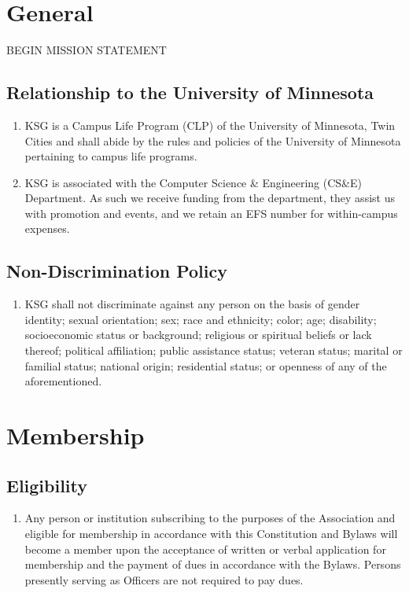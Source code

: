 \documentclass[12pt,letterpaper]{article}
\begin{document}
\section{General}

BEGIN MISSION STATEMENT

\subsection{Relationship to the University of Minnesota}
\begin{enumerate}
	\item KSG is a Campus Life Program (CLP) of the University of Minnesota,
        Twin Cities and shall abide by the rules and policies of the University
				of Minnesota pertaining to campus life programs.
	\item KSG is associated with the Computer Science \& Engineering (CS\&E)
	      Department. As such we receive funding from the department, they assist
				us with promotion and events, and we retain an EFS number for
				within-campus expenses.
\end{enumerate}

\subsection{Non-Discrimination Policy}
\begin{enumerate}
	\item KSG shall not discriminate against any person on the basis of gender
	      identity; sexual orientation; sex; race and ethnicity; color; age;
				disability; socioeconomic status or background; religious or spiritual
				beliefs or lack thereof; political affiliation; public assistance status;
				veteran status; marital or familial status; national origin; residential
				status; or openness of any of the aforementioned.
\end{enumerate}

\section{Membership}

\subsection{Eligibility}
\begin{enumerate}
	\item Any person or institution subscribing to the purposes of the Association
	      and eligible for membership in accordance with this Constitution and
				Bylaws will become a member upon the acceptance of written or verbal
				application for membership and the payment of dues in accordance with
				the Bylaws. Persons presently serving as Officers are not required to
				pay dues.
\end{enumerate}
\end{document}
